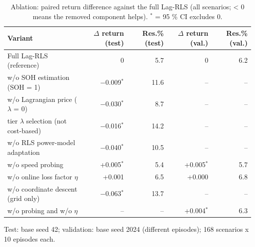 \begin{table}[t]
\centering
\caption{Ablation: paired return difference against the full Lag-RLS (all scenarios; < 0 means the removed component helps). $^{*}$ = 95 \% CI excludes 0.}
\label{tab:ablation}
\footnotesize
\setlength{\tabcolsep}{4pt}
\begin{tabular}{lrrrr}
\toprule
Variant & $\Delta$ return (test) & Res.\% (test) & $\Delta$ return (val.) & Res.\% (val.) \\
\midrule
Full Lag-RLS (reference) & 0 & 5.7 & 0 & 6.2 \\
\midrule
w/o SOH estimation (SOH = 1) & $-$0.009$^{*}$ & 11.6 & – & – \\
w/o Lagrangian price ($\lambda$ = 0) & $-$0.030$^{*}$ & 8.7 & – & – \\
tier $\lambda$ selection (not cost-based) & $-$0.016$^{*}$ & 14.2 & – & – \\
w/o RLS power-model adaptation & $-$0.040$^{*}$ & 10.5 & – & – \\
w/o speed probing & +0.005$^{*}$ & 5.4 & +0.005$^{*}$ & 5.7 \\
w/o online loss factor $\eta$ & +0.001 & 6.5 & +0.000 & 6.8 \\
w/o coordinate descent (grid only) & $-$0.063$^{*}$ & 13.7 & – & – \\
w/o probing and w/o $\eta$ & – & – & +0.004$^{*}$ & 6.3 \\
\bottomrule
\end{tabular}
\par\vspace{2pt}\parbox{\linewidth}{\scriptsize Test: base seed 42; validation: base seed 2024 (different episodes); 168 scenarios x 10 episodes each.}
\end{table}
